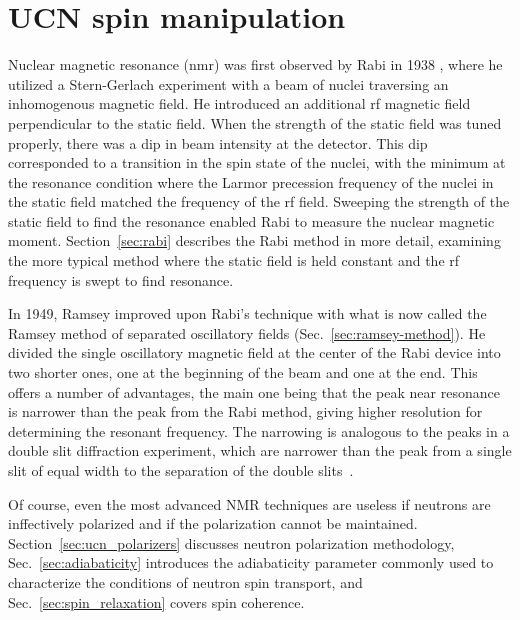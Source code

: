 
\chapter{UCN spin manipulation}\label{chap:spinManipulation}


Nuclear magnetic resonance (\acrshort*{nmr}) was first observed by Rabi in 1938 \cite{rabi_1938}, where he utilized a Stern-Gerlach experiment with a beam of nuclei traversing an inhomogenous magnetic field. He introduced an additional \acrshort{rf} magnetic field perpendicular to the static field. When the strength of the static field was tuned properly, there was a dip in beam intensity at the detector. This dip corresponded to a transition in the spin state of the nuclei, with the minimum at the resonance condition where the Larmor precession frequency of the nuclei in the static field matched the frequency of the \acrshort*{rf} field. Sweeping the strength of the static field to find the resonance enabled Rabi to measure the nuclear magnetic moment. Section~\ref{sec:rabi} describes the Rabi method in more detail, examining the more typical method where the static field is held constant and the \acrshort{rf} frequency is swept to find resonance.

In 1949, Ramsey \cite{ramsey_molecular_1950} improved upon Rabi's technique with what is now called the Ramsey method of separated oscillatory fields (Sec.~\ref{sec:ramsey-method}).  He divided the single oscillatory magnetic field at the center of the Rabi device into two shorter ones, one at the beginning of the beam and one at the end. This offers a number of advantages, the main one being that the peak near resonance is narrower than the peak from the Rabi method, giving higher resolution for determining the resonant frequency. The narrowing is analogous to the peaks in a double slit diffraction experiment, which are narrower than the peak from a single slit of equal width to the separation of the double slits~\cite{Ekspong1993}.

Of course, even the most advanced NMR techniques are useless if neutrons are inffectively polarized and if the polarization cannot be maintained. Section~\ref{sec:ucn_polarizers} discusses neutron polarization methodology, Sec.~\ref{sec:adiabaticity} introduces the adiabaticity parameter commonly used to characterize the conditions of neutron spin transport, and Sec.~\ref{sec:spin_relaxation} covers spin coherence.

